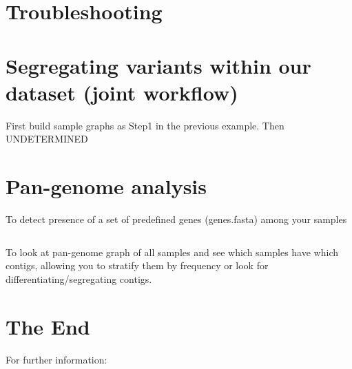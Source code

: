 \documentclass[a4paper,9pt]{extarticle}
\begin{document}
\begin{multicols*}{2}
\section{Troubleshooting}



\section{Segregating variants within our dataset (joint workflow)}
First build sample graphs as Step1 in the previous example. Then UNDETERMINED



\section{Pan-genome analysis}

To detect presence of a set of predefined genes (genes.fasta) among your samples
\begin{verbatim}
\end{verbatim}
To look at pan-genome graph of all samples and see which samples have which contigs, allowing you to stratify them by frequency or look for differentiating/segregating contigs.


\section{The End}

For further information:


\end{multicols*}
\end{document}
